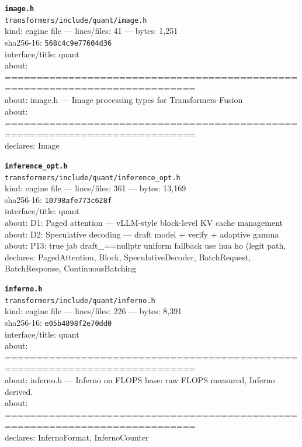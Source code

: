 \noindent\textbf{\texttt{image.h}}\\
\texttt{transformers/include/quant/image.h}\\
kind: engine file --- lines/files: 41 --- bytes: 1,251\\
sha256-16: \texttt{568c4c9e77604d36}\\
interface/title: quant\\
about: ============================================================================\\
about: image.h — Image processing types for Transformers-Fusion\\
about: ============================================================================\\
declares: Image\\
\vspace*{6.0pt}

\noindent\textbf{\texttt{inference\_opt.h}}\\
\texttt{transformers/include/quant/inference\_opt.h}\\
kind: engine file --- lines/files: 361 --- bytes: 13,169\\
sha256-16: \texttt{10798afe773c628f}\\
interface/title: quant\\
about: D1: Paged attention — vLLM-style block-level KV cache management\\
about: D2: Speculative decoding — draft model + verify + adaptive gamma\\
about: P13: true jab draft\_==nullptr uniform fallback use hua ho (legit path,\\
declares: PagedAttention, Block, SpeculativeDecoder, BatchRequest, BatchResponse, ContinuousBatching\\
\vspace*{6.0pt}

\noindent\textbf{\texttt{inferno.h}}\\
\texttt{transformers/include/quant/inferno.h}\\
kind: engine file --- lines/files: 226 --- bytes: 8,391\\
sha256-16: \texttt{e05b4898f2e70dd0}\\
interface/title: quant\\
about: ============================================================================\\
about: inferno.h — Inferno on FLOPS base: raw FLOPS measured, Inferno derived.\\
about: ============================================================================\\
declares: InfernoFormat, InfernoCounter\\
\vspace*{6.0pt}

